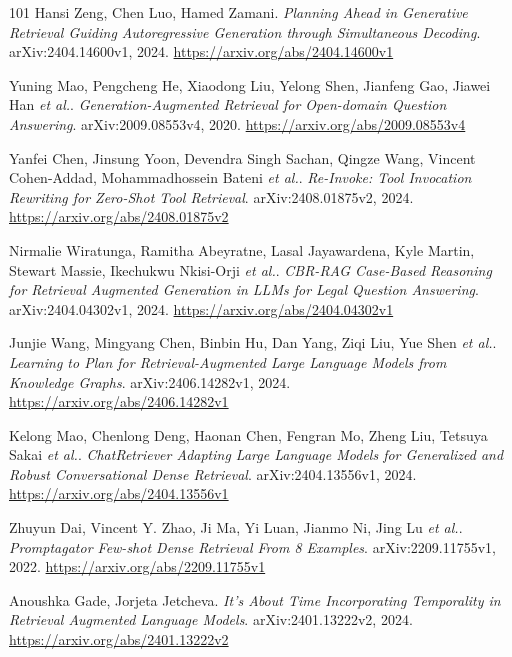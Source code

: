 \documentclass[11pt,a4paper]{article}
\begin{document}
\begin{thebibliography}{101}
Hansi Zeng, Chen Luo, Hamed Zamani.
\newblock \emph{Planning Ahead in Generative Retrieval Guiding Autoregressive Generation through Simultaneous Decoding}.
\newblock arXiv:2404.14600v1, 2024.
\newblock \url{https://arxiv.org/abs/2404.14600v1}

Yuning Mao, Pengcheng He, Xiaodong Liu, Yelong Shen, Jianfeng Gao, Jiawei Han \emph{et al.}.
\newblock \emph{Generation-Augmented Retrieval for Open-domain Question Answering}.
\newblock arXiv:2009.08553v4, 2020.
\newblock \url{https://arxiv.org/abs/2009.08553v4}

Yanfei Chen, Jinsung Yoon, Devendra Singh Sachan, Qingze Wang, Vincent Cohen-Addad, Mohammadhossein Bateni \emph{et al.}.
\newblock \emph{Re-Invoke: Tool Invocation Rewriting for Zero-Shot Tool Retrieval}.
\newblock arXiv:2408.01875v2, 2024.
\newblock \url{https://arxiv.org/abs/2408.01875v2}

Nirmalie Wiratunga, Ramitha Abeyratne, Lasal Jayawardena, Kyle Martin, Stewart Massie, Ikechukwu Nkisi-Orji \emph{et al.}.
\newblock \emph{CBR-RAG Case-Based Reasoning for Retrieval Augmented Generation in LLMs for Legal Question Answering}.
\newblock arXiv:2404.04302v1, 2024.
\newblock \url{https://arxiv.org/abs/2404.04302v1}

Junjie Wang, Mingyang Chen, Binbin Hu, Dan Yang, Ziqi Liu, Yue Shen \emph{et al.}.
\newblock \emph{Learning to Plan for Retrieval-Augmented Large Language Models from Knowledge Graphs}.
\newblock arXiv:2406.14282v1, 2024.
\newblock \url{https://arxiv.org/abs/2406.14282v1}

Kelong Mao, Chenlong Deng, Haonan Chen, Fengran Mo, Zheng Liu, Tetsuya Sakai \emph{et al.}.
\newblock \emph{ChatRetriever Adapting Large Language Models for Generalized and Robust Conversational Dense Retrieval}.
\newblock arXiv:2404.13556v1, 2024.
\newblock \url{https://arxiv.org/abs/2404.13556v1}

Zhuyun Dai, Vincent Y. Zhao, Ji Ma, Yi Luan, Jianmo Ni, Jing Lu \emph{et al.}.
\newblock \emph{Promptagator Few-shot Dense Retrieval From 8 Examples}.
\newblock arXiv:2209.11755v1, 2022.
\newblock \url{https://arxiv.org/abs/2209.11755v1}

Anoushka Gade, Jorjeta Jetcheva.
\newblock \emph{It's About Time Incorporating Temporality in Retrieval Augmented Language Models}.
\newblock arXiv:2401.13222v2, 2024.
\newblock \url{https://arxiv.org/abs/2401.13222v2}


\end{thebibliography}
\end{document}
